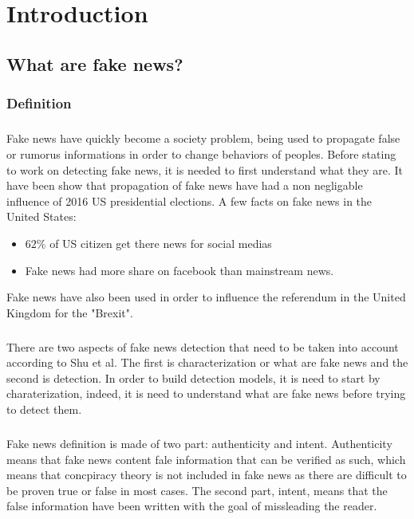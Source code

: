 \chapter{Introduction} \label{section:intro}
\section{What are fake news?}
\subsection{Definition}
\paragraph{} Fake news have quickly become a society problem, being used to propagate false or rumorus informations in order to change behaviors of peoples. Before stating to work on detecting fake news, it is needed to first understand what they are. It have been show that propagation of fake news have had a non negligable influence of 2016 US presidential elections\cite{Allcott2017}. A few facts on fake news in the United States: 

\begin{itemize}
	\item $62\%$ of US citizen get there news for social medias\cite{gottfried2016news}
	\item Fake news had more share on facebook than mainstream news\cite{silverman2016teens}.
\end{itemize}

Fake news have also been used in order to influence the referendum in the United Kingdom for the "Brexit".

\paragraph{}There are two aspects of fake news detection that need to be taken into account according to Shu et al\cite{shu2017fake}. The first is characterization or what are fake news and the second is detection. In order to build detection models, it is need to start by charaterization, indeed, it is need to understand what are fake news before trying to detect them. 
\paragraph{}
Fake news definition is made of two part: authenticity and intent. Authenticity means that fake news content fale information that can be verified as such, which means that concpiracy theory is not included in fake news as there are difficult to be proven true or false in most cases. The second part, intent, means that the false information have been written with the goal of missleading the reader. 


